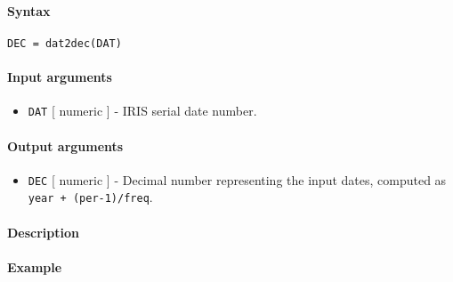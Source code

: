 


	\paragraph{Syntax}\label{syntax}

\begin{verbatim}
DEC = dat2dec(DAT)
\end{verbatim}

\paragraph{Input arguments}\label{input-arguments}

\begin{itemize}
\itemsep1pt\parskip0pt
\item
  \texttt{DAT} {[} numeric {]} - IRIS serial date number.
\end{itemize}

\paragraph{Output arguments}\label{output-arguments}

\begin{itemize}
\itemsep1pt\parskip0pt
\item
  \texttt{DEC} {[} numeric {]} - Decimal number representing the input
  dates, computed as \texttt{year + (per-1)/freq}.
\end{itemize}

\paragraph{Description}\label{description}

\paragraph{Example}\label{example}



